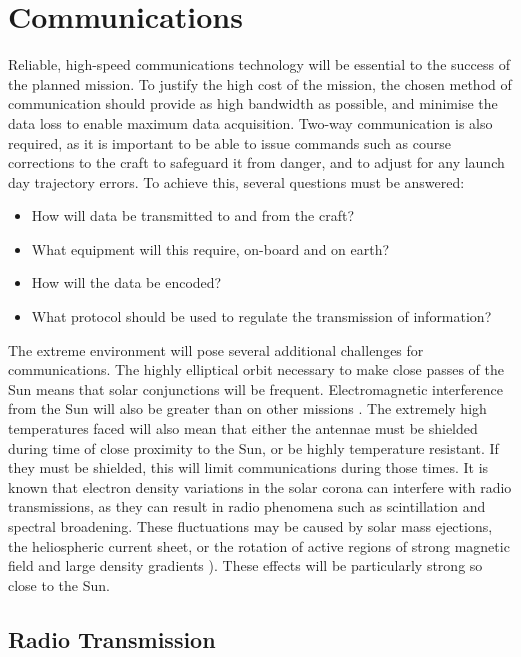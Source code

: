 \documentclass[12pt]{article}
\begin{document}
\vspace{\baselineskip}


\section{Communications} \label{Communications}


Reliable, high-speed communications technology will be essential to the success of the planned mission. To justify the high cost of the mission, the chosen method of communication should provide as high bandwidth as possible, and minimise the data loss to enable maximum data acquisition. Two-way communication is also required, as it is important to be able to issue commands such as course corrections to the craft to safeguard it from danger, and to adjust for any launch day trajectory errors. To achieve this, several questions must be answered: 

\begin{itemize}
    \item How will data be transmitted to and from the craft?
    \item What equipment will this require, on-board and on earth?
    \item How will the data be encoded?
    \item What protocol should be used to regulate the transmission of information?
\end{itemize}

The extreme environment will pose several additional challenges for communications. The highly elliptical orbit necessary to make close passes of the Sun means that solar conjunctions will be frequent. Electromagnetic interference from the Sun will also be greater than on other missions \cite{parkermissionoverview}. The extremely high temperatures faced will also mean that either the antennae must be shielded during time of close proximity to the Sun, or be highly temperature resistant. If they must be shielded, this will limit communications during those times. It is known that electron density variations in the solar corona can interfere with radio transmissions, as they can result in radio phenomena such as scintillation and spectral broadening. These fluctuations may be caused by solar mass ejections, the heliospheric current sheet, or the rotation of active regions of strong magnetic field and large density gradients \cite{spacweather}). These effects will be particularly strong so close to the Sun.

\subsection{Radio Transmission}
\end{document}
